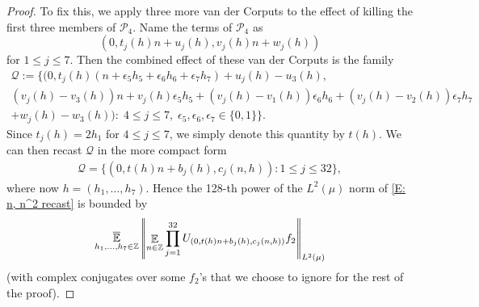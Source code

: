 \documentclass[11pt]{amsart}
\theoremstyle{definition}
\DeclareMathOperator*{\oE}{\overline{\mathbb{E}}}
\DeclareMathOperator*{\E}{\mathbb{E}}
\newcommand{\Z}{{\mathbb Z}}
\newcommand{\CP}{{\mathcal P}}
\newcommand{\CQ}{{\mathcal Q}}
\newcommand{\eps}{\epsilon}
\newcommand{\1}{{\mathbf{1}}}
\begin{document}
\begin{proof}
    To fix this, we apply three more van der Corputs to the effect of killing the first three members of $\CP_4$. Name the terms of $\CP_4$ as $$(0,t_j(h)n + u_j(h),v_j(h)n+w_j(h))$$ for $1\leq j\leq 7$. Then the combined effect of these van der Corputs is the family
    \begin{multline*}
        \CQ := \{(0, t_j(h)(n +\eps_5h_5 + \eps_6 h_6 +\eps_7h_7) + u_j(h)-u_3(h),\\
        (v_j(h)-v_3(h))n + v_j(h)\eps_5h_5 + (v_j(h)-v_1(h))\eps_6 h_6 +(v_j(h)-v_2(h))\eps_7h_7\\ + w_j(h)-w_3(h))\colon\;
        4\leq j\leq 7,\; \eps_5,\eps_6,\eps_7\in\{0,1\}\}.
    \end{multline*}
    Since $t_j(h) = 2h_1$ for $4\leq j\leq 7$, we simply denote this quantity by $t(h)$. We can then recast $\CQ$ in the more compact form
    \begin{align*}
        \CQ = \{(0, t(h)n + b_j(h), c_j(n,h))\colon 1\leq j\leq 32\}, 
    \end{align*}
    where now $h = (h_1, \ldots, h_7)$. Hence the 128-th power of the $L^2(\mu)$ norm of \eqref{E: n, n^2 recast} is bounded by
    \begin{align}\label{E: average example 1}
        \oE_{h_1,\dots, h_7\in\Z}\left|\!\left|\E_{n\in\Z}\prod_{j=1}^{32} U_{(0, t(h)n + b_j(h),c_j(n,h))} f_2\vphantom{\E_{n\in[N]}}\right|\!\right|_{L^2(\mu)}
    \end{align}
    (with complex conjugates over some $f_2$'s that we choose to ignore for the rest of the proof). 


\end{proof}
\end{document}
